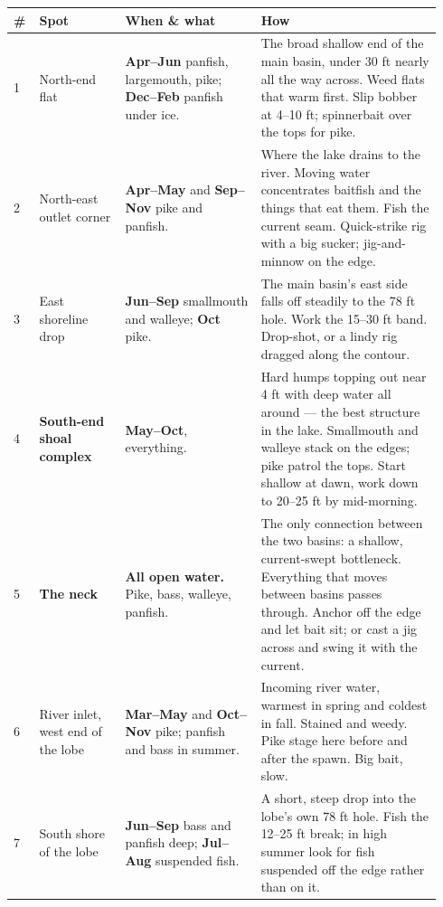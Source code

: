 \begin{longtable}{@{}p{0.045\linewidth}>{\raggedright\arraybackslash}p{0.19\linewidth}>{\raggedright\arraybackslash}p{0.30\linewidth}>{\raggedright\arraybackslash}p{0.40\linewidth}@{}}
\toprule
\textbf{\#} & \textbf{Spot} & \textbf{When \& what} & \textbf{How}\\
\midrule
\endhead
1 & North-end flat &
  \textbf{Apr--Jun} panfish, largemouth, pike; \textbf{Dec--Feb} panfish under ice. &
  The broad shallow end of the main basin, under 30 ft nearly all the way across.
  Weed flats that warm first. Slip bobber at 4--10 ft; spinnerbait over the tops
  for pike.\\
2 & North-east outlet corner &
  \textbf{Apr--May} and \textbf{Sep--Nov} pike and panfish. &
  Where the lake drains to the river. Moving water concentrates baitfish and the
  things that eat them. Fish the current seam. Quick-strike rig with a big
  sucker; jig-and-minnow on the edge.\\
3 & East shoreline drop &
  \textbf{Jun--Sep} smallmouth and walleye; \textbf{Oct} pike. &
  The main basin's east side falls off steadily to the 78 ft hole. Work the
  15--30 ft band. Drop-shot, or a lindy rig dragged along the contour.\\
4 & \textbf{South-end shoal complex} &
  \textbf{May--Oct}, everything. &
  Hard humps topping out near 4 ft with deep water all around --- the best
  structure in the lake. Smallmouth and walleye stack on the edges; pike patrol
  the tops. Start shallow at dawn, work down to 20--25 ft by mid-morning.\\
5 & \textbf{The neck} &
  \textbf{All open water.} Pike, bass, walleye, panfish. &
  The only connection between the two basins: a shallow, current-swept
  bottleneck. Everything that moves between basins passes through. Anchor off
  the edge and let bait sit; or cast a jig across and swing it with the current.\\
6 & River inlet, west end of the lobe &
  \textbf{Mar--May} and \textbf{Oct--Nov} pike; panfish and bass in summer. &
  Incoming river water, warmest in spring and coldest in fall. Stained and
  weedy. Pike stage here before and after the spawn. Big bait, slow.\\
7 & South shore of the lobe &
  \textbf{Jun--Sep} bass and panfish deep; \textbf{Jul--Aug} suspended fish. &
  A short, steep drop into the lobe's own 78 ft hole. Fish the 12--25 ft break;
  in high summer look for fish suspended off the edge rather than on it.\\
\bottomrule
\end{longtable}

